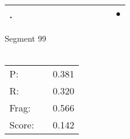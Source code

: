 \documentclass[landscape]{article}
\newcommand{\ssp}{\hspace{2pt}}
\newcommand{\mex}{\cellcolor{g}$\bullet$}
\begin{document}
\begin{tabular}{|l|p{10pt}|p{10pt}|p{10pt}|p{10pt}|p{10pt}|p{10pt}|p{10pt}|p{10pt}|p{10pt}|p{10pt}|p{10pt}|}
\hline
\ssp \cellcolor{ref10}. \ssp&\hspace{2pt}&\hspace{2pt}&\hspace{2pt}&\hspace{2pt}&\hspace{2pt}&\hspace{2pt}&\hspace{2pt}&\hspace{2pt}&\hspace{2pt}&\hspace{2pt}&\hspace{2pt}\mex\\
\hline
\end{tabular}

\vspace{6pt}
\noindent Segment 99\\\\
\noindent\begin{tabular}{lm{12pt}r}
\hline
P:&&0.381\\
R:&&0.320\\
Frag:&&0.566\\
Score:&&0.142\\
\end{tabular}

\newpage
\end{document}
